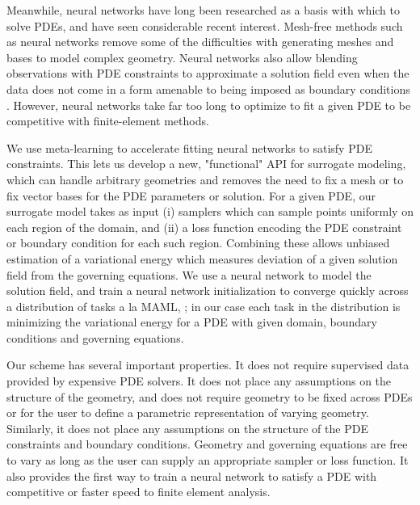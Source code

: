 Meanwhile, neural networks have long been researched as a basis with which
to solve PDEs, and have seen considerable recent interest.
Mesh-free methods such as neural networks remove some of the difficulties with
generating meshes and bases to model complex geometry.
Neural networks also allow blending observations with PDE constraints to approximate
a solution field even when the data does not come in a form amenable to being
imposed as boundary conditions \citep{raissi2019physics}.
However, neural networks take far too long to optimize to fit a given PDE to
be competitive with finite-element methods.

We use meta-learning to accelerate fitting neural networks to satisfy PDE constraints.
This lets us develop a new, "functional" API for surrogate modeling, which can handle
arbitrary geometries and removes the need to fix a mesh or to fix vector bases for the
PDE parameters or solution.
For a given PDE, our surrogate model takes as input
(i) samplers which can sample points uniformly on each region of the domain, and
(ii) a loss function encoding the PDE constraint or boundary condition for each such region.
Combining these allows unbiased estimation of a variational energy which measures
deviation of a given solution field from the governing equations.
We use a neural network to model the solution field, and train a neural network
initialization to converge quickly across a distribution of tasks
a la MAML, \citet{finn2017model}; in our case each task in the distribution
is minimizing the variational energy for a PDE with given domain, boundary
conditions and governing equations.

Our scheme has several important properties.
It does not require supervised data provided by expensive PDE solvers.
It does not place any assumptions on the structure of the geometry, and does not
require geometry to be fixed across PDEs or for the user to define a parametric
representation of varying geometry.
Similarly, it does not place any assumptions on the structure of the PDE constraints and
boundary conditions.
Geometry and governing equations are free to vary as long as the user can supply an
appropriate sampler or loss function.
It also provides the first way to train a neural network to satisfy a PDE
with competitive or faster speed to finite element analysis.
